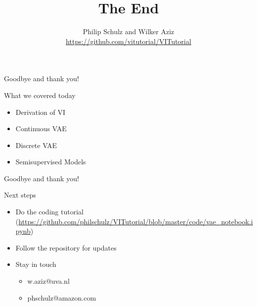 \documentclass[14pt, aspectratio=169]{beamer}
\title{The End}
\author{Philip Schulz and Wilker Aziz\\
\url{https://github.com/vitutorial/VITutorial}}
\date{}
\begin{document}
\begin{frame}
\maketitle
\end{frame}

\begin{frame}{Goodbye and thank you!}
\begin{block}{What we covered today}
\begin{itemize}
\item Derivation of VI
\item Continuous VAE
\item Discrete VAE
\item Semisupervised Models
\end{itemize}
\end{block}
\end{frame}

\begin{frame}{Goodbye and thank you!}
\begin{block}{Next steps}
\begin{itemize}
\item Do the coding tutorial (\href{https://github.com/vitutorial/VITutorial/blob/master/code/vae_notebook.ipynb}{\url{https://github.com/philschulz/VITutorial/blob/master/code/vae_notebook.ipynb}}) \pause
\item Follow the repository for updates \pause
\item Stay in touch
\begin{itemize}
\item w.aziz@uva.nl
\item phschulz@amazon.com
\end{itemize}
\end{itemize}
\end{block}
\end{frame}
\end{document}
